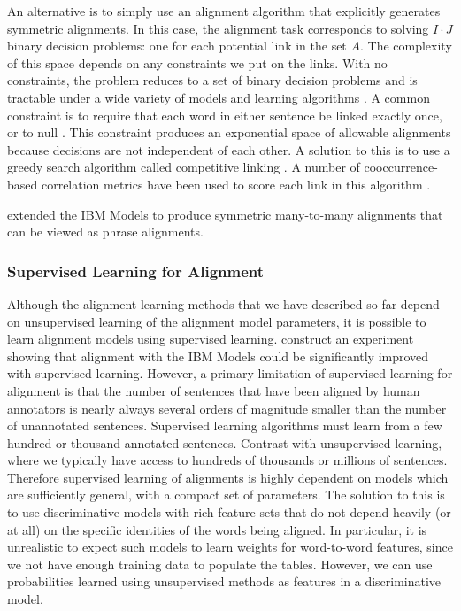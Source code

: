 An alternative is to simply use an 
alignment algorithm that explicitly generates
symmetric alignments.  In this case, the 
alignment task corresponds to solving
$I\cdot J$ binary decision problems: one
for each potential link in the set $A$.
The complexity of this space depends on
any constraints we put on the links.  With
no constraints, the problem reduces to a
set of binary decision problems and is
tractable under a wide variety of models and
learning algorithms 
\citep{Ayan:2005:hlt:tbl,Ayan:2005:hlt:neuralign,Ayan:2006:hlt-naacl,Liang:2006:hlt-naacl}.
A common constraint is to require that each word
in either sentence be linked exactly once,
or to null \citep{Melamed:2000:cl}.  This 
constraint produces an exponential space of
allowable alignments because decisions
are not independent of each other.  A 
solution to this is to use a greedy search
algorithm called competitive linking
\citep{Melamed:2000:cl}.  A number of 
cooccurrence-based 
correlation metrics have been used to
score each link in this algorithm 
\citep{Gale:1991:wsnl,Melamed:2000:cl,Cherry:2003:acl,Moore:2005:wpt}.

\citet{Fraser:2007:emnlp-conll} extended
the IBM Models to produce
symmetric many-to-many alignments that
can be viewed as phrase alignments.

\subsubsection{Supervised Learning for Alignment}\label{sec:supervised-alignment}

Although the alignment learning methods that we have 
described so far depend on unsupervised learning of
the alignment model parameters, it is possible
to learn alignment models using supervised learning.
\citet{Callison-Burch:2004:acl} construct an
experiment showing that alignment with the 
IBM Models could be significantly improved 
with supervised learning.  However, a primary
limitation of supervised learning for alignment
is that the number of sentences that have
been aligned by human annotators is nearly always
several orders of magnitude smaller than 
the number of unannotated sentences.  Supervised learning 
algorithms must learn from a few hundred or thousand annotated
sentences.  Contrast with unsupervised 
learning, where we typically have 
access to hundreds of thousands or millions of 
sentences.  Therefore supervised learning of
alignments is highly dependent on models which
are sufficiently general, with a compact 
set of parameters.  The
solution to this is to use discriminative
models with rich feature sets that do not
depend heavily (or at all) on the specific
identities of the words being aligned.  In
particular, it is unrealistic to expect such
models to learn weights for word-to-word features,
since we not have enough training data to 
populate the tables.  However, we can use 
probabilities learned using unsupervised methods
as features in a discriminative model.

